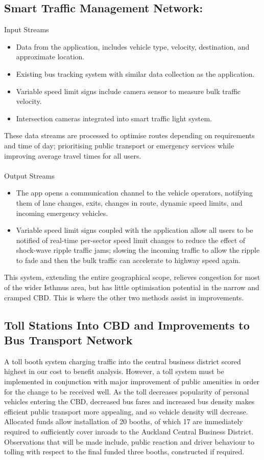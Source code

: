 \documentclass[twoside, a4paper, 11pt]{article}
\begin{document}
\subsection{Smart Traffic Management Network:}
Input Streams
\begin{itemize}
\item Data from the application, includes vehicle type, velocity, destination, and approximate location.
\item Existing bus tracking system with similar data collection as the application.
\item Variable speed limit signs include camera sensor to measure bulk traffic velocity.
\item Intersection cameras integrated into smart traffic light system.
\end{itemize}
These data streams are processed to optimise routes depending on requirements and time of day; prioritising public transport or emergency services while improving average travel times for all users.\\\\
Output Streams
\begin{itemize}
\item The app opens a communication channel to the vehicle operators, notifying them of lane changes, exits, changes in route, dynamic speed limits, and incoming emergency vehicles.
\item Variable speed limit signs coupled with the application allow all users to be notified of real-time per-sector speed limit changes to reduce the effect of shock-wave ripple traffic jams; slowing the incoming traffic to allow the ripple to fade and then the bulk traffic can accelerate to highway speed again.
\end{itemize}

This system, extending the entire geographical scope, relieves congestion for most of the wider Isthmus area, but has little optimisation potential in the narrow and cramped CBD. This is where the other two methods assist in improvements.


\subsection{Toll Stations Into CBD and Improvements to Bus Transport Network}

A toll booth system charging traffic into the central business district scored highest in our cost to benefit analysis. However, a toll system must be implemented in conjunction with major improvement of public amenities in order for the change to be received well.
As the toll decreases popularity of personal vehicles entering the CBD, decreased bus fares and increased bus density makes efficient public transport more appealing, and so vehicle density will decrease. Allocated funds allow installation of 20 booths, of which 17 are immediately required to sufficiently cover inroads to the Auckland Central Business District. Observations that will be made include, public reaction and driver behaviour to tolling with respect to the final funded three booths, constructed if required.
\end{document}

